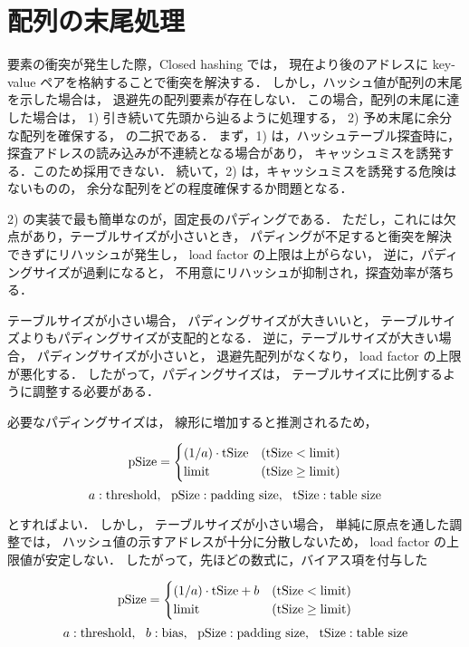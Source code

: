 \section{配列の末尾処理}

要素の衝突が発生した際，Closed hashing では，
現在より後のアドレスに key-value ペアを格納することで衝突を解決する．
しかし，ハッシュ値が配列の末尾を示した場合は，
退避先の配列要素が存在しない．
この場合，配列の末尾に達した場合は，
1) 引き続いて先頭から辿るように処理する，
2) 予め末尾に余分な配列を確保する，
の二択である．
まず，1) は，ハッシュテーブル探査時に，
探査アドレスの読み込みが不連続となる場合があり，
キャッシュミスを誘発する．このため採用できない．
続いて，2) は，キャッシュミスを誘発する危険はないものの，
余分な配列をどの程度確保するか問題となる．

2) の実装で最も簡単なのが，固定長のパディングである．
ただし，これには欠点があり，テーブルサイズが小さいとき，
パディングが不足すると衝突を解決できずにリハッシュが発生し，
load factor の上限は上がらない，
逆に，パディングサイズが過剰になると，
不用意にリハッシュが抑制され，探査効率が落ちる．

テーブルサイズが小さい場合，
パディングサイズが大きいいと，
テーブルサイズよりもパディングサイズが支配的となる．
逆に，テーブルサイズが大きい場合，
パディングサイズが小さいと，
退避先配列がなくなり，
load factor の上限が悪化する．
したがって，パディングサイズは，
テーブルサイズに比例するように調整する必要がある．

必要なパディングサイズは，
線形に増加すると推測されるため，

\[
  {\rm pSize} = \begin{cases}
    (1/a) \cdot {\rm tSize} & ({\rm tSize}<{\rm limit}) \\
    {\rm limit}    & ({\rm tSize}\geq{\rm limit})
  \end{cases}
\]
\[
  a: {\rm threshold}, \ \ 
  {\rm pSize}: {\rm padding \ size}, \ \ 
  {\rm tSize: table \ size}
\]

とすればよい．
しかし，
テーブルサイズが小さい場合，
単純に原点を通した調整では，
ハッシュ値の示すアドレスが十分に分散しないため，
load factor の上限値が安定しない．
したがって，先ほどの数式に，バイアス項を付与した

\[
  {\rm pSize} = \begin{cases}
    (1/a) \cdot {\rm tSize} + b & ({\rm tSize}<{\rm limit}) \\
    {\rm limit}    & ({\rm tSize}\geq{\rm limit})
  \end{cases}
\]
\[
  a: {\rm threshold}, \ \ 
  b: {\rm bias}, \ \ 
  {\rm pSize}: {\rm padding \ size}, \ \ 
  {\rm tSize}: {\rm table \ size}
\]

